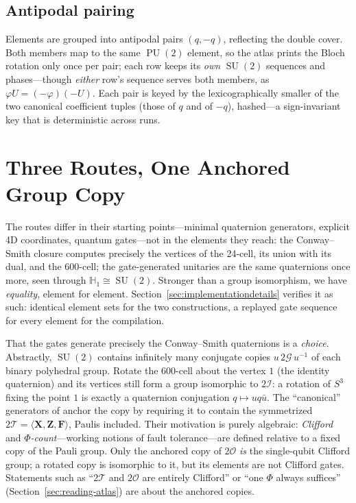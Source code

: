 \documentclass[11pt, oneside, openany]{scrbook}
\DeclareMathOperator{\SU}{SU}
\DeclareMathOperator{\PU}{PU}
\newcommand{\Tgroup}{\mathcal{T}}  %
\newcommand{\Ogroup}{\mathcal{O}}  %
\newcommand{\Igroup}{\mathcal{I}}  %
\newcommand{\Ggroup}{\mathcal{G}}
\newcommand{\TwoT}{2\Tgroup}
\newcommand{\TwoO}{2\Ogroup}
\newcommand{\TwoI}{2\Igroup}
\newcommand{\TwoG}{2\Ggroup}
\begin{document}
\subsection{Antipodal pairing}

Elements are grouped into antipodal pairs $(q, -q)$, reflecting the double cover. Both members map to the same $\PU(2)$ element, so the atlas prints the Bloch rotation only once per pair; each row keeps its \textit{own} $\SU(2)$ sequences and phases---though \textit{either} row's sequence serves both members, as $\varphi U = (-\varphi)(-U)$.
Each pair is keyed by the lexicographically smaller of the two canonical coefficient tuples (those of $q$ and of $-q$), hashed---a sign-invariant key that is deterministic across runs.

\section{Three Routes, One Anchored Group Copy} \label{sec:constructionrelationship}

The routes differ in their starting points---minimal quaternion generators, explicit 4D coordinates, quantum gates---not in the elements they reach: the Conway--Smith closure computes precisely the vertices of the 24-cell, its union with its dual, and the 600-cell; the gate-generated unitaries are the same quaternions once more, seen through $\mathbb{H}_1 \cong \SU(2)$. Stronger than a group isomorphism, we have \textit{equality}, element for element. Section~\ref{sec:implementationdetails} verifies it as such: identical element sets for the two constructions, a replayed gate sequence for every element for the compilation.

That the gates generate precisely the Conway--Smith quaternions is a \textit{choice}. Abstractly, $\SU(2)$ contains infinitely many conjugate copies $u\,\TwoG\,u^{-1}$ of each binary polyhedral group. Rotate the 600-cell about the vertex $1$ (the identity quaternion) and its vertices still form a group isomorphic to $\TwoI$: a rotation of $S^3$ fixing the point $1$ is exactly a quaternion conjugation $q \mapsto u q \bar{u}$. The ``canonical'' generators of \textcite{kubischta2023familyquantumcodes} anchor the copy by requiring it to contain the symmetrized $\TwoT = \langle \mathbf{X}, \mathbf{Z}, \mathbf{F} \rangle$, Paulis included. Their motivation is purely algebraic: \textit{Clifford} and \textit{$\Phi$-count}---working notions of fault tolerance---are defined relative to a fixed copy of the Pauli group. Only the anchored copy of $\TwoO$ \textit{is} the single-qubit Clifford group; a rotated copy is isomorphic to it, but its elements are not Clifford gates. Statements such as ``$\TwoT$ and $\TwoO$ are entirely Clifford'' or ``one $\Phi$ always suffices'' (Section~\ref{sec:reading-atlas}) are about the anchored copies.
\end{document}
